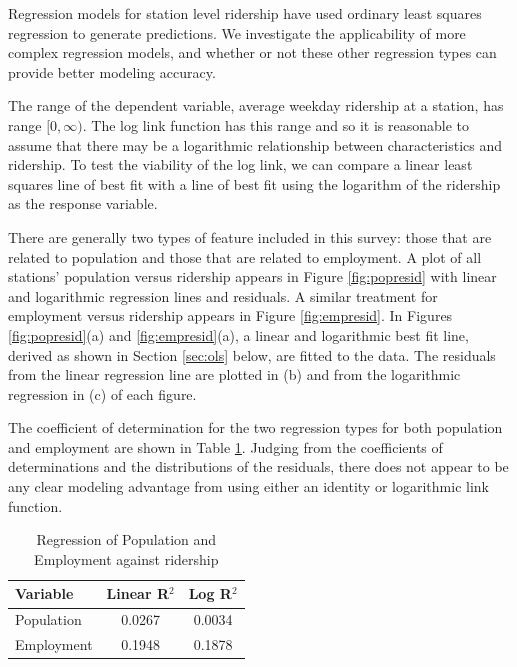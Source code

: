 \documentclass[11pt]{article}
\begin{document}
Regression models for station level ridership have used ordinary least squares regression \cite{Kuby2004, Taylor2008, Currie2011, Durning2015, Gutierrez2011} to generate predictions. We investigate the applicability of more complex regression models, and whether or not these other regression types can provide better modeling accuracy.

The range of the dependent variable, average weekday ridership at a station, has range $[0, \infty)$. The log link function has this range and so it is reasonable to assume that there may be a logarithmic relationship between characteristics and ridership. To test the viability of the log link, we can compare a linear least squares line of best fit with a line of best fit using the logarithm of the ridership as the response variable.

There are generally two types of feature included in this survey: those that are related to population and those that are related to employment. A plot of all stations' population versus ridership appears in Figure \ref{fig:popresid} with linear and logarithmic regression lines and residuals. A similar treatment for employment versus ridership appears in Figure \ref{fig:empresid}. In Figures  \ref{fig:popresid}(a) and \ref{fig:empresid}(a), a linear and logarithmic best fit line, derived as shown in Section \ref{sec:ols} below, are fitted to the data. The residuals from the linear regression line are plotted in (b) and from the logarithmic regression in (c) of each figure. 

The coefficient of determination for the two regression types for both population and employment are shown in Table \ref{tab:regr2}. Judging from the coefficients of determinations and the distributions of the residuals, there does not appear to be any clear modeling advantage from using either an identity or logarithmic link function. 

\begin{table}[H]
\centering
\begin{tabular}{lcc}
\toprule Variable&Linear R$^2$&Log R$^2$ \\ 
\midrule Population&0.0267&0.0034 \\
Employment&0.1948&0.1878 \\
\bottomrule
\end{tabular}
\caption{Regression of Population and Employment against ridership}\label{tab:regr2}
\end{table}
\end{document}
